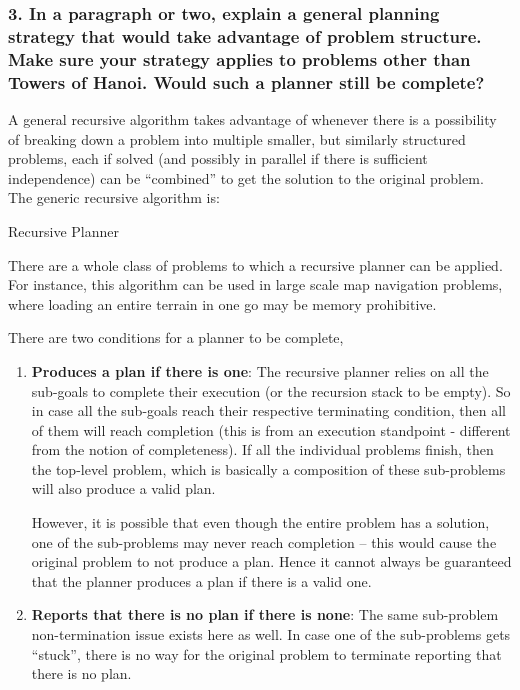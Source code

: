 \documentclass[10pt, letter]{article}
\begin{document}
\subsubsection*{3. In a paragraph or two, explain a general planning strategy that would take advantage of
problem structure. Make sure your strategy applies to problems other than Towers of Hanoi.
Would such a planner still be complete?}

A general recursive algorithm takes advantage of whenever there is a possibility of breaking down a problem into multiple smaller, but similarly structured problems, each if solved (and possibly in parallel if there is sufficient independence) can be ``combined'' to get the solution to the original problem. The generic recursive algorithm is:

\begin{algorithm}
  \caption{Recursive Planner}
  \begin{algorithmic}[1]
			\State {} 
		\EndIf
		\State {}
    \EndFunction
  \end{algorithmic}
\end{algorithm}

There are a whole class of problems to which a recursive planner can be applied. For instance, this algorithm can be used in large scale map navigation problems, where loading an entire terrain in one go may be memory prohibitive.

There are two conditions for a planner to be complete,
\begin{enumerate}
\item \textbf{Produces a plan if there is one}: The recursive planner relies on all the sub-goals to complete their execution (or the recursion stack to be empty). So in case all the sub-goals reach their respective terminating condition, then all of them will reach completion (this is from an execution standpoint - different from the notion of completeness). If all the individual problems finish, then the top-level problem, which is basically a composition of these sub-problems will also produce a valid plan.

However, it is possible that even though the entire problem has a solution, one of the sub-problems may never reach completion -- this would cause the original problem to not produce a plan. Hence it cannot always be guaranteed that the planner produces a plan if there is a valid one.

\item \textbf{Reports that there is no plan if there is none}: The same sub-problem non-termination issue exists here as well. In case one of the sub-problems gets ``stuck'', there is no way for the original problem to terminate reporting that there is no plan. 
\end{enumerate}
\end{document}
